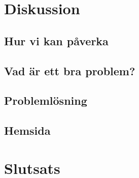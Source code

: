 \documentclass[11 pt,a4paper]{article}
\begin{document}
\section{Diskussion}

    \subsection{Hur vi kan påverka}
        
    
    \subsection{Vad är ett bra problem?}
        
        
    \subsection{Problemlösning}
        
    
    \subsection{Hemsida}
        

\section{Slutsats}

\newpage
\begin{thebibliography}{3}
    
\end{thebibliography}
\end{document}
